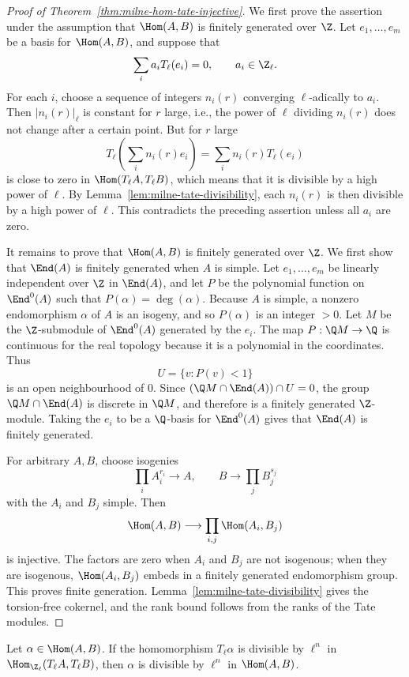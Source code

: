 \begin{proof}[Proof of Theorem~\ref{thm:milne-hom-tate-injective}]
We first prove the assertion under the assumption that $\Hom(A,B)$ is
finitely generated over $\Z$.  Let $e_1,\ldots,e_m$ be a basis for
$\Hom(A,B)$, and suppose that
\[
\sum_i a_iT_\ell(e_i)=0,\qquad a_i\in\Z_\ell.
\]
For each $i$, choose a sequence of integers $n_i(r)$ converging
$\ell$-adically to $a_i$.  Then $|n_i(r)|_\ell$ is constant for $r$ large,
i.e., the power of $\ell$ dividing $n_i(r)$ does not change after a certain
point.  But for $r$ large
\[
T_\ell\left(\sum_i n_i(r)e_i\right)=
\sum_i n_i(r)T_\ell(e_i)
\]
is close to zero in $\Hom(T_\ell A,T_\ell B)$, which means that it is
divisible by a high power of $\ell$.  By Lemma~\ref{lem:milne-tate-divisibility},
each $n_i(r)$ is then divisible by a high power of $\ell$.  This contradicts
the preceding assertion unless all $a_i$ are zero.

It remains to prove that $\Hom(A,B)$ is finitely generated over $\Z$.  We
first show that $\End(A)$ is finitely generated when $A$ is simple.  Let
$e_1,\ldots,e_m$ be linearly independent over $\Z$ in $\End(A)$, and let
$P$ be the polynomial function on $\End^0(A)$ such that $P(\alpha)=\deg(\alpha)$.
Because $A$ is simple, a nonzero endomorphism $\alpha$ of $A$ is an isogeny,
and so $P(\alpha)$ is an integer $>0$.  Let $M$ be the $\Z$-submodule of
$\End^0(A)$ generated by the $e_i$.  The map $P:\Q M\to\Q$ is continuous
for the real topology because it is a polynomial in the coordinates.  Thus
\[
U=\{v:P(v)<1\}
\]
is an open neighbourhood of $0$.  Since
$(\Q M\cap\End(A))\cap U=0$, the group $\Q M\cap\End(A)$ is discrete in
$\Q M$, and therefore is a finitely generated $\Z$-module.  Taking the $e_i$
to be a $\Q$-basis for $\End^0(A)$ gives that $\End(A)$ is finitely generated.

For arbitrary $A,B$, choose isogenies
\[
\prod_i A_i^{r_i}\longrightarrow A,\qquad
B\longrightarrow\prod_j B_j^{s_j}
\]
with the $A_i$ and $B_j$ simple.  Then
\[
\Hom(A,B)\longrightarrow\prod_{i,j}\Hom(A_i,B_j)
\]
is injective.  The factors are zero when $A_i$ and $B_j$ are not isogenous;
when they are isogenous, $\Hom(A_i,B_j)$ embeds in a finitely generated
endomorphism group.  This proves finite generation.  Lemma~\ref{lem:milne-tate-divisibility}
gives the torsion-free cokernel, and the rank bound follows from the ranks of
the Tate modules.
\end{proof}

\begin{lemma}
\label{lem:milne-tate-divisibility}

Let $\alpha\in\Hom(A,B)$.  If the homomorphism $T_\ell\alpha$ is divisible
by $\ell^n$ in $\Hom_{\Z_\ell}(T_\ell A,T_\ell B)$, then $\alpha$ is divisible by
$\ell^n$ in $\Hom(A,B)$.
\end{lemma}

